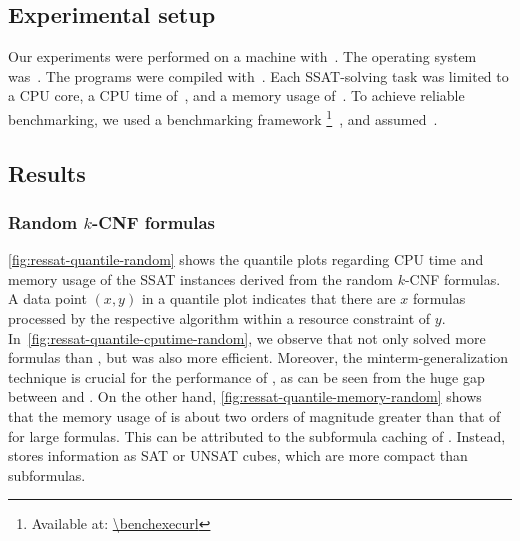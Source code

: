 \subsection{Experimental setup}
Our experiments were performed on a machine with~\machineSpec.
The operating system was~\osInfo.
The programs were compiled with~\compiler.
Each SSAT-solving task was limited to a CPU core,
a CPU time of~\timelimit,
and a memory usage of~\memlimit.
To achieve reliable benchmarking,
we used a benchmarking framework \benchexec\footnote{Available at: \url{\benchexecurl}}~\cite{Benchmarking-STTT},
and assumed~\measurement.

\subsection{Results}

\subsubsection{Random $k$-CNF formulas}

\cref{fig:ressat-quantile-random} shows the quantile plots regarding CPU time and memory usage
of the SSAT instances derived from the random $k$-CNF formulas.
A data point $(x,y)$ in a quantile plot indicates that
there are $x$ formulas processed by the respective algorithm within a resource constraint of $y$.
In~\cref{fig:ressat-quantile-cputime-random},
we observe that \ressat not only solved more formulas than \dcssat,
but was also more efficient.
Moreover, the minterm-generalization technique is crucial for the performance of \ressat,
as can be seen from the huge gap between \ressat and \ressatb.
On the other hand,
\cref{fig:ressat-quantile-memory-random} shows that the memory usage of \dcssat is about two orders of magnitude greater than that of \ressat for large formulas.
This can be attributed to the subformula caching of \dcssat.
Instead, \ressat stores information as SAT or UNSAT cubes,
which are more compact than subformulas.

